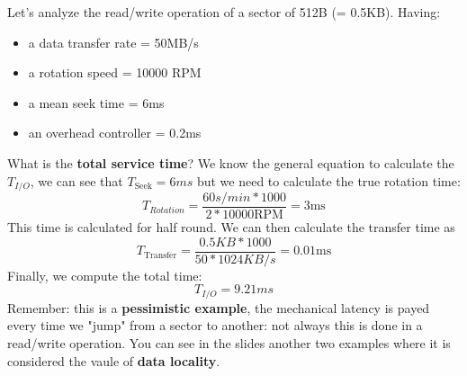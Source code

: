\begin{ex}
    Let's analyze the read/write operation of a sector of 512B (= 0.5KB).
    Having:
    \begin{itemize}
        \item a data transfer rate = 50MB/s
        \item a rotation speed = 10000 RPM
        \item a mean seek time = 6ms
        \item an overhead controller = 0.2ms
    \end{itemize}
    What is the \textbf{total service time}? \newline
    We know the general equation to calculate the $T_{I/O}$, we can see that 
    $T_{\text{Seek}} = 6ms$ but we need to calculate the true rotation time:
    \begin{equation}
        T_{Rotation} = \frac{60s/min * 1000}{2 * 10000 \text{RPM}} = 3\text{ms}   
    \end{equation}
    This time is calculated for half round. We can then calculate the transfer 
    time as
    \begin{equation}
        T_{\text{Transfer}} = \frac{0.5KB * 1000}{50 * 1024KB/s} = 0.01\text{ms}    
    \end{equation}
    Finally, we compute the total time:
    \begin{equation}
        T_{I/O} = 9.21ms   
    \end{equation}
    Remember: this is a \textbf{pessimistic example}, the mechanical latency
    is payed every time we "jump" from a sector to another: not always this 
    is done in a read/write operation. You can see in the slides another 
    two examples where it is considered the vaule of \textbf{data locality}.
\end{ex}

